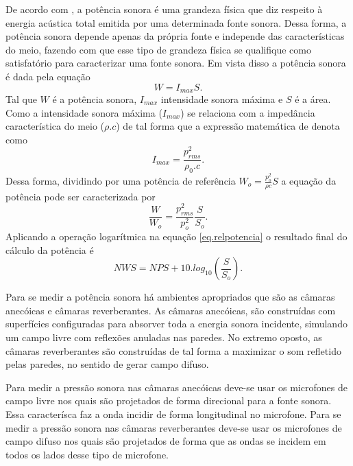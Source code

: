 De acordo com \cite{potencia}, a potência sonora é uma grandeza física que diz respeito à energia acústica total emitida por uma determinada fonte sonora. Dessa forma, a potência sonora depende apenas da própria fonte e independe das características do meio, fazendo com que esse tipo de grandeza física se qualifique como satisfatório para caracterizar uma fonte sonora. Em vista disso a potência sonora é dada pela equação
\begin{equation}
W = I_{max}S.
\label{eq.potencia}
\end{equation}
Tal que $W$ é a potência sonora, $I_{max}$ intensidade sonora máxima e $S$ é a área. Como a intensidade sonora máxima ($I_{max}$) se relaciona com a impedância característica do meio ($\rho . c$) de tal forma que a expressão matemática de denota como \begin{equation}
I_{max}=\frac{p_{rms}^{2}}{\rho_{0} . c}.
\label{eq.intensidade}
\end{equation}
Dessa forma, dividindo por uma potência de referência $W_{o}= \frac{p_{o}^{2}}{\rho c}S $ a equação da potência pode ser caracterizada por
 \begin{equation}
	\frac{W}{W_{o}}=\frac{p_{rms}^{2}}{p_{o}^{2}}\frac{S}{S_{o}}.
\label{eq.relpotencia}
\end{equation}
Aplicando a operação logarítmica na equação \ref{eq.relpotencia} o resultado final do cálculo da potência é
\begin{equation}
	NWS = NPS + 10 . log_{10}\left(\frac{S}{S_{o}}\right).
\end{equation}

Para se medir a potência sonora há ambientes apropriados que são as câmaras anecóicas e câmaras reverberantes. As câmaras anecóicas, são construídas com superfícies configuradas para absorver toda a energia sonora incidente, simulando um campo livre com reflexões anuladas nas paredes. No extremo oposto, as câmaras reverberantes são construídas de tal forma a maximizar o som refletido pelas paredes, no sentido de gerar campo difuso.

Para medir a pressão sonora nas câmaras anecóicas deve-se usar os microfones de campo livre nos quais são projetados de forma direcional para a fonte sonora. Essa caracterísca faz a onda incidir de forma longitudinal no microfone. Para se medir a pressão sonora nas câmaras reverberantes deve-se usar os microfones de campo difuso nos quais são projetados de forma que as ondas se incidem em todos os lados desse tipo de microfone.


